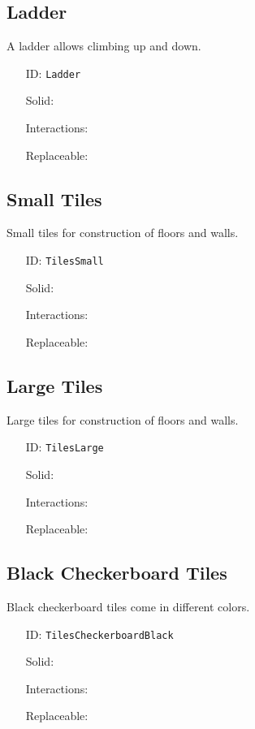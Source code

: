 \subsection{Ladder}\label{subsec:blocks_ladder}
A ladder allows climbing up and down.
\newline
\begin{itemize}[nosep]
\item[ID:] \texttt{Ladder}
\item[Solid:]  \XSolidBrush \item[Interactions:]  \XSolidBrush \item[Replaceable:]  \XSolidBrush \end{itemize}

\subsection{Small Tiles}\label{subsec:blocks_small tiles}
Small tiles for construction of floors and walls.
\newline
\begin{itemize}[nosep]
\item[ID:] \texttt{TilesSmall}
\item[Solid:]  \Checkmark \item[Interactions:]  \XSolidBrush \item[Replaceable:]  \XSolidBrush \end{itemize}

\subsection{Large Tiles}\label{subsec:blocks_large tiles}
Large tiles for construction of floors and walls.
\newline
\begin{itemize}[nosep]
\item[ID:] \texttt{TilesLarge}
\item[Solid:]  \Checkmark \item[Interactions:]  \XSolidBrush \item[Replaceable:]  \XSolidBrush \end{itemize}

\subsection{Black Checkerboard Tiles}\label{subsec:blocks_black checkerboard tiles}
Black checkerboard tiles come in different colors.
\newline
\begin{itemize}[nosep]
\item[ID:] \texttt{TilesCheckerboardBlack}
\item[Solid:]  \Checkmark \item[Interactions:]  \Checkmark \item[Replaceable:]  \XSolidBrush \end{itemize}

